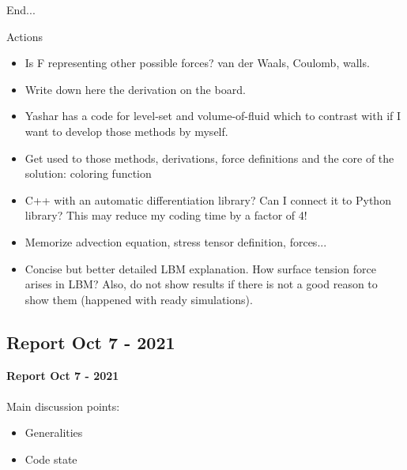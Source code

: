 \documentclass{beamer}
\begin{document}
		\begin{frame}
			End...
		\end{frame}
	
		\begin{frame}{Actions}
			\begin{itemize}
				\item Is F representing other possible forces? van der Waals, Coulomb, walls. \item Write down here the derivation on the board.
				\item Yashar has a code for level-set and volume-of-fluid which to contrast with if I want to develop those methods by myself.
				\item Get used to those methods, derivations, force definitions and the core of the solution: coloring function
				\item C++ with an automatic differentiation library? Can I connect it to Python library? This may reduce my coding time by a factor of 4!
				\item Memorize advection equation, stress tensor definition, forces... 
				\item Concise but better detailed LBM explanation. How surface tension force arises in LBM? Also, do not show results if there is not a good reason to show them (happened with ready simulations).
				
			\end{itemize}
		\end{frame}
		
		\subsection{Report Oct 7 - 2021}
		\justifying
		\begin{frame}
			\textbf{Report Oct 7 - 2021}\\~\\
			Main discussion points:
			\begin{itemize}
				\item Generalities
				\item Code state
			\end{itemize}
		\end{frame}
			
\end{document}
